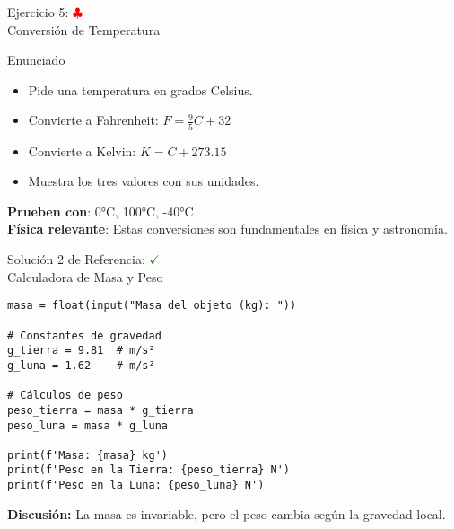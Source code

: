 \documentclass[10pt]{beamer}
\begin{document}
\begin{frame}{Ejercicio 5: \hfill \textcolor{red}{$\clubsuit$} \\ Conversión de Temperatura}
  \begin{block}{Enunciado}
    \begin{itemize}
      \item Pide una temperatura en grados Celsius.
      \item Convierte a Fahrenheit: \(F = \frac{9}{5}C + 32\)
      \item Convierte a Kelvin: \(K = C + 273.15\)
      \item Muestra los tres valores con sus unidades.
    \end{itemize}
  \end{block}
  
  \textbf{Prueben con}: 0°C, 100°C, -40°C
  \\
  \textbf{Física relevante}: Estas conversiones son fundamentales en física y astronomía.
\end{frame}



\begin{frame}[fragile]{Solución 2 de Referencia: \hfill \textcolor{green}{$\checkmark$} \\ Calculadora de Masa y Peso}
\begin{verbatim}
masa = float(input("Masa del objeto (kg): "))

# Constantes de gravedad
g_tierra = 9.81  # m/s²
g_luna = 1.62    # m/s²

# Cálculos de peso
peso_tierra = masa * g_tierra
peso_luna = masa * g_luna

print(f'Masa: {masa} kg')
print(f'Peso en la Tierra: {peso_tierra} N')
print(f'Peso en la Luna: {peso_luna} N')
\end{verbatim}
\textbf{Discusión:} La masa es invariable, pero el peso cambia según la gravedad local.
\end{frame}
\end{document}

